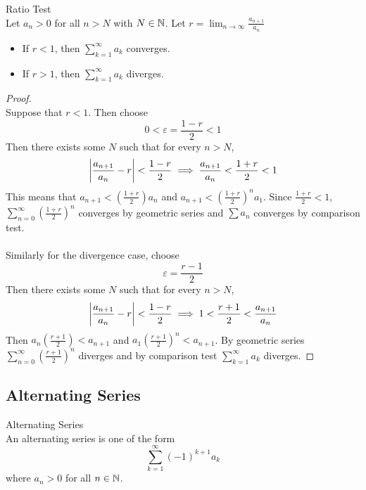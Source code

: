 \documentclass[a4paper]{article}
\begin{document}
\begin{thm}{Ratio Test}{}\\ Let $a_n>0$ for all $n>N$ with $N\in\mathbb{N}$. Let $r=\lim_{n\to\infty}\frac{a_{n+1}}{a_n}$
\begin{itemize} 
\item If $r<1$, then $\sum_{k=1}^\infty a_k$ converges. 
\item If $r>1$, then $\sum_{k=1}^\infty a_k$ diverges. 
\end{itemize} 
\begin{proof}\\ Suppose that $r<1$. Then choose $$0<\varepsilon=\frac{1-r}{2}<1$$ Then there exists some $N$ such that for every $n>N$, $$\abs{\frac{a_{n+1}}{a_n}-r}<\frac{1-r}{2}\implies\frac{a_{n+1}}{a_n}<\frac{1+r}{2}<1$$ This means that $a_{n+1}<(\frac{1+r}{2})a_n$ and $a_{n+1}<(\frac{1+r}{2})^na_1$. Since $\frac{1+r}{2}<1$, $\sum_{n=0}^{\infty}(\frac{1+r}{2})^n$ converges by geometric series and $\sum a_n$ converges by comparison test. \\~\\
Similarly for the divergence case, choose $$\varepsilon=\frac{r-1}{2}$$ Then there exists some $N$ such that for every $n>N$, $$\abs{\frac{a_{n+1}}{a_n}-r}<\frac{1-r}{2}\implies 1<\frac{r+1}{2}<\frac{a_{n+1}}{a_n}$$ Then $a_n(\frac{r+1}{2})<a_{n+1}$ and $a_1(\frac{r+1}{2})^n<a_{n+1}$. By geometric series $\sum_{n=0}^{\infty}(\frac{r+1}{2})^n$ diverges and by comparison test $\sum_{k=1}^\infty a_k$ diverges. 
\end{proof}
\end{thm}

\subsection{Alternating Series}
\begin{defn}{Alternating Series}{}\\ An alternating series is one of the form $$\sum_{k=1}^{\infty}(-1)^{k+1}a_k$$ where $a_n>0$ for all $n\in\mathbb{N}$. 
\end{defn}
\end{document}

